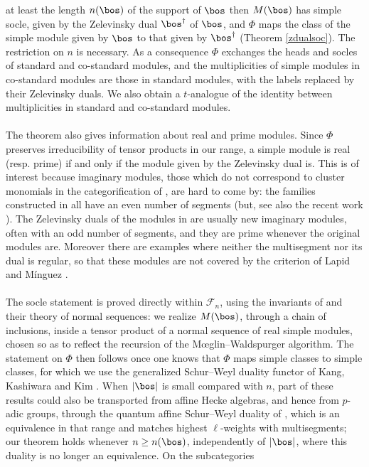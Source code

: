 \documentclass[11pt,reqno]{amsart}
\theoremstyle{definition} \newtheorem*{defn}{Definition}
\theoremstyle{definition}
\numberwithin{equation}{section}
\begin{document}
at least the length $n(\bos)$ of the support of $\bos$ then $M(\bos)$ has simple socle, given by the Zelevinsky dual $\bos^\dagger$ of
$\bos$, and $\Phi$ maps the class of the simple module given by $\bos$ to that given by $\bos^\dagger$ (Theorem \ref{zdualsoc}). The
restriction on $n$ is necessary. As a consequence $\Phi$ exchanges the heads and socles of standard and co-standard modules,
and the multiplicities of simple modules in co-standard modules are those in standard modules, with the labels replaced by
their Zelevinsky duals. We also obtain a $t$-analogue of the identity between
multiplicities in standard and co-standard modules.
\\\\
The theorem also gives information about real and prime modules. Since $\Phi$ preserves irreducibility of tensor products in
our range, a simple module is real (resp. prime) if and only if the module given by the Zelevinsky dual is. This is of
interest because imaginary modules, those which do not correspond to cluster monomials in the categorification of
\cite{HL13a,KKOP}, are hard to come by: the families constructed in \cite{BC23,BM25} all have an even number of segments (but, see
also the recent work \cite{LP26,Sak25}). The Zelevinsky duals of the modules in \cite{BC23,BM25} are usually new imaginary modules,
often with an odd number of segments, and they are prime whenever the original modules are. Moreover there are examples where
neither the multisegment nor its dual is regular, so that these modules are not covered by the criterion of Lapid and
M\'inguez \cite{LM18}.
\\\\
The socle statement is proved directly within $\mathscr F_n$, using the invariants of \cite{KKOP} and their theory of normal
sequences: we realize $M(\bos)$, through a chain of inclusions, inside a tensor product of a normal sequence of real simple
modules, chosen so as to reflect the recursion of the M\oe glin--Waldspurger algorithm. The statement on $\Phi$ then follows
once one knows that $\Phi$ maps simple classes to simple classes, for which we use the generalized Schur--Weyl duality functor of
Kang, Kashiwara and Kim \cite{KKK15}. When $|\bos|$ is small compared with $n$, part of these results could also be transported
from affine Hecke algebras, and hence from $p$-adic groups, through the quantum affine Schur--Weyl duality of \cite{CP96}, which is an equivalence in that range and matches highest $\ell$-weights with multisegments; our theorem
holds whenever $n\ge n(\bos)$, independently of $|\bos|$, where this duality is no longer an equivalence. On the subcategories
\end{document}
